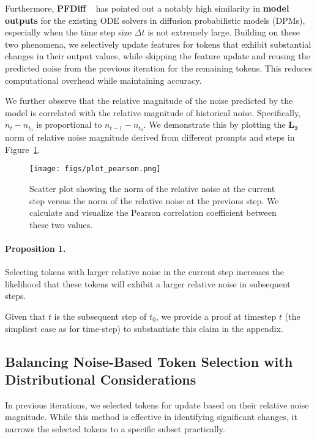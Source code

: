 \documentclass[10pt]{article}
\begin{document}
Furthermore, \textbf{PFDiff} ~\citep{wang2024pfdifftrainingfreeaccelerationdiffusion} has pointed out a notably high similarity in \textbf{model outputs} for the existing ODE solvers in diffusion probabilistic models (DPMs), especially when the time step size $\Delta t$ is not extremely large. Building on these two phenomena, we selectively update features for tokens that exhibit substantial changes in their output values, while skipping the feature update and reusing the predicted noise from the previous iteration for the remaining tokens. This reduces computational overhead while maintaining accuracy.

We further observe that the relative magnitude of the noise predicted by the model is correlated with the relative magnitude of historical noise. Specifically, $n_t- n_{t_{0}}$ is proportional to $n_{t-1}- n_{t_{0}}$. We demonstrate this by plotting the $\mathbf{L_2}$ norm of relative noise magnitude derived from different prompts and steps in Figure~\ref{fig:scatterplot}.

\begin{figure}[H]
    \centering
    \texttt{[image: figs/plot\_pearson.png]}
    \caption{Scatter plot showing the norm of the relative noise at the current step versus the norm of the relative noise at the previous step. We calculate and visualize the Pearson correlation coefficient between these two values.}
    \label{fig:scatterplot}
\end{figure}



\paragraph{Proposition 1.} Selecting tokens with larger relative noise in the current step increases the likelihood that these tokens will exhibit a larger relative noise in subsequent steps.

Given that $t$ is the subsequent step of $t_0$, we provide a proof at timestep $t$ (the simpliest case as for time-step) to substantiate this claim in the appendix.



\subsection{Balancing Noise-Based Token Selection with Distributional Considerations}
\label{sec::balance}

In previous iterations, we selected tokens for update based on their relative noise magnitude. While this method is effective in identifying significant changes, it narrows the selected tokens to a specific subset practically. 
\end{document}
